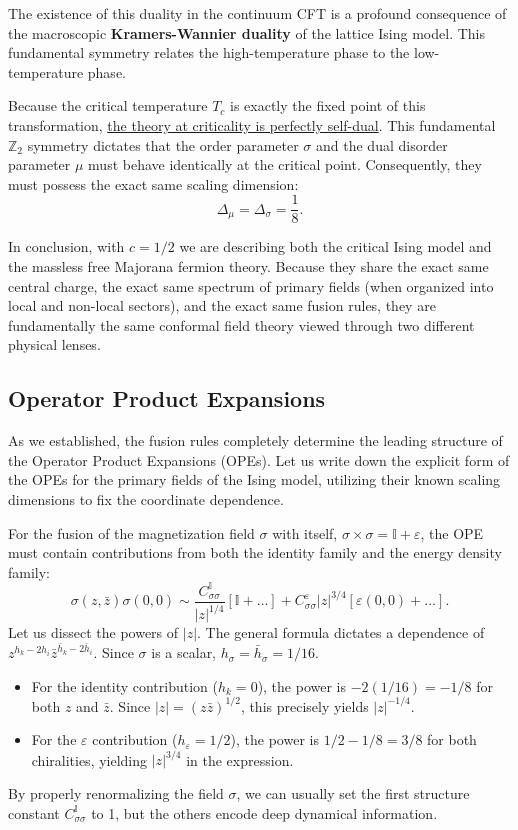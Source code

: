 The existence of this duality in the continuum CFT is a profound consequence of the macroscopic \textbf{Kramers-Wannier duality} of the lattice Ising model. This fundamental symmetry relates the high-temperature phase to the low-temperature phase.

Because the critical temperature \(T_c\) is exactly the fixed point of this transformation, \uline{the theory at criticality is perfectly self-dual}. This fundamental \(\mathbb{Z}_2\) symmetry dictates that the order parameter \(\sigma\) and the dual disorder parameter \(\mu\) must behave identically at the critical point. Consequently, they must possess the exact same scaling dimension:
\[
    \Delta_\mu = \Delta_\sigma = \frac{1}{8}.
\]

In conclusion, with \(c = 1/2\) we are describing both the critical Ising model and the massless free Majorana fermion theory. Because they share the exact same central charge, the exact same spectrum of primary fields (when organized into local and non-local sectors), and the exact same fusion rules, they are fundamentally the same conformal field theory viewed through two different physical lenses.

\subsection{Operator Product Expansions}

As we established, the fusion rules completely determine the leading structure of the Operator Product Expansions (OPEs). Let us write down the explicit form of the OPEs for the primary fields of the Ising model, utilizing their known scaling dimensions to fix the coordinate dependence.

For the fusion of the magnetization field \(\sigma\) with itself, \(\sigma \times \sigma = \mathbb{I} + \varepsilon\), the OPE must contain contributions from both the identity family and the energy density family:
\[
    \sigma(z, \bar{z})\sigma(0,0) \sim \frac{C_{\sigma\sigma}^{\mathbb{I}}}{|z|^{1/4}} \left[ \mathbb{I} + \dots \right] + C_{\sigma\sigma}^\varepsilon |z|^{3/4} \left[ \varepsilon(0,0) + \dots \right].
\]
Let us dissect the powers of \(|z|\). The general formula dictates a dependence of \(z^{h_k - 2h_i} \bar{z}^{\bar{h}_k - 2\bar{h}_i}\). Since \(\sigma\) is a scalar, \(h_\sigma = \bar{h}_\sigma = 1/16\).
\begin{itemize}
    \item For the identity contribution (\(h_k = 0\)), the power is \(-2(1/16) = -1/8\) for both \(z\) and \(\bar{z}\). Since \(|z| = (z\bar{z})^{1/2}\), this precisely yields \(|z|^{-1/4}\).
    \item For the \(\varepsilon\) contribution (\(h_\varepsilon = 1/2\)), the power is \(1/2 - 1/8 = 3/8\) for both chiralities, yielding \(|z|^{3/4}\) in the expression.
\end{itemize}
\begin{remark}
    By properly renormalizing the field \(\sigma\), we can usually set the first structure constant \(C_{\sigma\sigma}^{\mathbb{I}}\) to 1, but the others encode deep dynamical information.
\end{remark}

